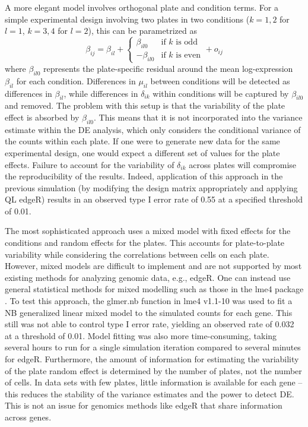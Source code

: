 \documentclass{article}
\begin{document}
A more elegant model involves orthogonal plate and condition terms.
For a simple experimental design involving two plates in two conditions ($k=1,2$ for $l=1$, $k=3,4$ for $l=2$), this can be parametrized as
\[
    \beta_{ij} = \beta_{il} + 
    \begin{cases} 
        \beta_{il0} & \mbox{if $k$ is odd} \\
        - \beta_{il0} & \mbox{if $k$ is even}
    \end{cases}
    + o_{ij}
\]
where $\beta_{il0}$ represents the plate-specific residual around the mean log-expression $\beta_{il}$ for each condition.
Differences in $\mu_{il}$ between conditions will be detected as differences in $\beta_{il}$, 
    while differences in $\delta_{ik}$ within conditions will be captured by $\beta_{il0}$ and removed.
The problem with this setup is that the variability of the plate effect is absorbed by $\beta_{il0}$.
This means that it is not incorporated into the variance estimate within the DE analysis, which only considers the conditional variance of the counts within each plate.
If one were to generate new data for the same experimental design, one would expect a different set of values for the plate effects.
Failure to account for the variability of $\delta_{ik}$ across plates will compromise the reproducibility of the results.
Indeed, application of this approach in the previous simulation (by modifying the design matrix appropriately and applying QL edgeR)
    results in an observed type I error rate of 0.55 at a specified threshold of 0.01.

The most sophisticated approach uses a mixed model with fixed effects for the conditions and random effects for the plates.
This accounts for plate-to-plate variability while considering the correlations between cells on each plate.
However, mixed models are difficult to implement and are not supported by most existing methods for analyzing genomic data, e.g., edgeR.
One can instead use general statistical methods for mixed modelling such as those in the lme4 package \cite{bates2015fitting}.
To test this approach, the glmer.nb function in lme4 v1.1-10 was used to fit a NB generalized linear mixed model to the simulated counts for each gene.
This still was not able to control type I error rate, yielding an observed rate of 0.032 at a threshold of 0.01.
Model fitting was also more time-consuming, taking several hours to run for a single simulation iteration compared to several minutes for edgeR.
Furthermore, the amount of information for estimating the variability of the plate random effect is determined by the number of plates, not the number of cells.
In data sets with few plates, little information is available for each gene -- this reduces the stability of the variance estimates and the power to detect DE.
This is not an issue for genomics methods like edgeR that share information across genes.
\end{document}
